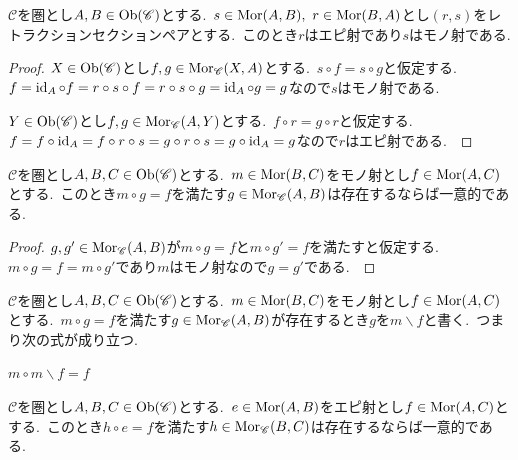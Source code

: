 \begin{proposition} \label{prop: epi_and_mono_of_retraction_section_pair}
$\mathscr{C}$を圏とし$A,B \in \operatorname{Ob}(\mathscr{C})$とする.\
$s \in \operatorname{Mor}(A, B),\ r \in \operatorname{Mor}(B, A)$とし$(r,s)$をレトラクションセクションペアとする.\
このとき$r$はエピ射であり$s$はモノ射である.
\end{proposition}

\begin{proof}
$X \in \operatorname{Ob}(\mathscr{C})$とし$f,g \in \operatorname{Mor}_{\mathscr{C}}(X, A)$とする.\
$s \circ f = s \circ g$と仮定する.\
$f = \operatorname{id}_A \circ f = r \circ s \circ f = r \circ s \circ g = \operatorname{id}_A \circ g = g$なので$s$はモノ射である.\

$Y \in \operatorname{Ob}(\mathscr{C})$とし$f,g \in \operatorname{Mor}_{\mathscr{C}}(A, Y)$とする.\
$f \circ r = g \circ r$と仮定する.\
$f = f \circ \operatorname{id}_A = f \circ r \circ s = g \circ r \circ s = g \circ \operatorname{id}_A = g$なので$r$はエピ射である.\
\end{proof}

\begin{proposition} \label{prop: factorization_unique_of_mono}
$\mathscr{C}$を圏とし$A,B,C \in \operatorname{Ob}(\mathscr{C})$とする.\
$m \in \operatorname{Mor}(B, C)$をモノ射とし$f \in \operatorname{Mor}(A, C)$とする.\
このとき$m \circ g = f$を満たす$g \in \operatorname{Mor}_{\mathscr{C}}(A,B)$は存在するならば一意的である.\
\end{proposition}

\begin{proof}
$g,g' \in \operatorname{Mor}_{\mathscr{C}}(A, B)$が$m \circ g = f$と$m \circ g' = f$を満たすと仮定する.\
$m \circ g = f = m \circ g'$であり$m$はモノ射なので$g = g'$である.\
\end{proof}

\begin{definition} \label{def: monoFactor}
$\mathscr{C}$を圏とし$A,B,C \in \operatorname{Ob}(\mathscr{C})$とする.\
$m \in \operatorname{Mor}(B, C)$をモノ射とし$f \in \operatorname{Mor}(A, C)$とする.\
$m \circ g = f$を満たす$g \in \operatorname{Mor}_{\mathscr{C}}(A, B)$が存在するとき$g$を$m \backslash f$と書く.\ つまり次の式が成り立つ.\
\begin{center}
$m \circ m \backslash f = f$
\end{center}
\end{definition}

\begin{proposition} \label{prop: factorization_unique_of_epi}
$\mathscr{C}$を圏とし$A,B,C \in \operatorname{Ob}(\mathscr{C})$とする.\
$e \in \operatorname{Mor}(A, B)$をエピ射とし$f \in \operatorname{Mor}(A, C)$とする.\
このとき$h \circ e = f$を満たす$h \in \operatorname{Mor}_{\mathscr{C}}(B,C)$は存在するならば一意的である.\
\end{proposition}

